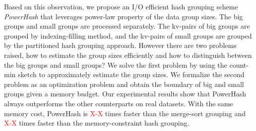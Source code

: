 Based on this observation, we propose an I/O efficient hash grouping scheme \emph{PowerHash} that leverages power-law property of the data group sizes. The big groups and small groups are processed separately. The kv-pairs of big groups are grouped by indexing-filling method, and the kv-pairs of small groups are grouped by the partitioned hash grouping approach. However there are two problems raised, how to estimate the group sizes efficiently and how to distinguish between the big groups and small groups? We solve the first problem by using the count-min sketch \cite{Cormode2009Count} to approximately estimate the group sizes. We formalize the second problem as an optimization problem and obtain the boundary of big and small groups given a memory budget. Our experimental results show that PowerHash always outperforms the other counterparts on real datasets. With the same memory cost, PowerHash is \textcolor{red}{X-X} times faster than the merge-sort grouping and \textcolor{red}{X-X} times faster than the memory-constraint hash grouping.

